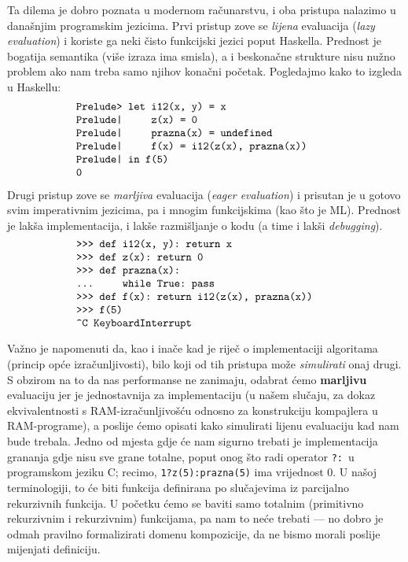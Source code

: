 Ta dilema je dobro poznata u modernom računarstvu, i oba pristupa nalazimo u današnjim programskim jezicima. Prvi pristup zove se \emph{lijena} evaluacija (\emph{lazy evaluation}) i koriste ga neki čisto funkcijski jezici poput Haskella. Prednost je bogatija semantika (više izraza ima smisla), a i beskonačne strukture nisu nužno problem ako nam treba samo njihov konačni početak. Pogledajmo kako to izgleda u Haskellu:
\begin{equation}\begin{minipage}{0.8\textwidth}
\begin{verbatim}
    Prelude> let i12(x, y) = x
    Prelude|     z(x) = 0
    Prelude|     prazna(x) = undefined
    Prelude|     f(x) = i12(z(x), prazna(x))
    Prelude| in f(5)
    0
\end{verbatim}
\end{minipage}\end{equation}

Drugi pristup zove se \emph{marljiva} evaluacija (\emph{eager evaluation}) i prisutan je u gotovo svim imperativnim jezicima, pa i mnogim funkcijskima (kao što je ML\@). Prednost je lakša implementacija, i lakše razmišljanje o kodu (a time i lakši \emph{debugging}). %
\begin{equation}\begin{minipage}{0.8\textwidth}
\begin{verbatim}
    >>> def i12(x, y): return x
    >>> def z(x): return 0
    >>> def prazna(x):
    ...     while True: pass
    >>> def f(x): return i12(z(x), prazna(x))
    >>> f(5)
    ^C KeyboardInterrupt
\end{verbatim}
\end{minipage}\end{equation}

Važno je napomenuti da, kao i inače kad je riječ o implementaciji algoritama (princip opće izračunljivosti), bilo koji od tih pristupa može \emph{simulirati} onaj drugi. S obzirom na to da nas performanse ne zanimaju, odabrat ćemo \textbf{marljivu} evaluaciju jer je jednostavnija za implementaciju (u našem slučaju, za dokaz ekvivalentnosti s RAM-izračunljivošću odnosno za konstrukciju kompajlera u RAM-programe), a poslije ćemo opisati kako simulirati lijenu evaluaciju kad nam bude trebala. Jedno od mjesta gdje će nam sigurno trebati je implementacija grananja gdje nisu sve grane totalne, poput onog što radi operator \texttt{?:}\ u programskom jeziku C; recimo, \texttt{1?z(5):prazna(5)} ima vrijednost $0$. U našoj terminologiji, to će biti funkcija definirana po slučajevima iz parcijalno rekurzivnih funkcija. U početku ćemo se baviti samo totalnim (primitivno rekurzivnim i rekurzivnim) funkcijama, pa nam to neće trebati --- no dobro je odmah pravilno formalizirati domenu kompozicije, da ne bismo morali poslije mijenjati definiciju.

